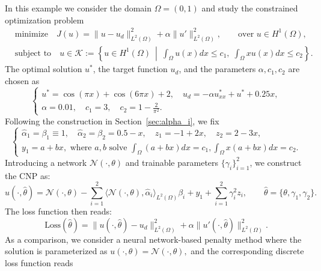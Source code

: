 \documentclass{article}
\numberwithin{equation}{section}
\begin{document}
In this example we consider the domain $\Omega=(0,1)$ and study the constrained optimization problem
\begin{align*}
    &\text{minimize}\quad J(u)=
    \|u-u_d\|_{L^2(\Omega)}^2 
    + \alpha\|u'\|_{L^2(\Omega)}^{2}, \qquad \text{over } u\in H^1(\Omega),\\
  &\text{subject to}\quad   u\in \mathcal{K}:=
    \left\{
    u\in H^1(\Omega)  
    \ \middle|\ 
    \int_\Omega u(x)dx\le c_1,\;
    \int_\Omega x u(x)dx\le c_2
    \right\}.
\end{align*}
The optimal solution $u^*$, the target function $u_d$, and the parameters $\alpha,c_1,c_2$ are chosen as
\begin{equation}
\begin{cases}
u^* = \cos(\pi x) + \cos(6\pi x) + 2,\quad
u_d = -\alpha u^*_{xx} + u^* + 0.25x, \\
\alpha=0.01, 
\quad 
c_1 = 3,
\quad 
c_2 = 1-\frac{2}{\pi^2}.
\end{cases} 
\end{equation}
Following the construction in Section~\ref{sec:alpha_i}, we fix
\begin{equation}
\begin{cases}
\hat{\alpha}_1=\beta_1\equiv 1, 
\quad 
\hat{\alpha}_2=\beta_2=0.5-x,\quad z_1 = -1+2x,
\quad 
z_2=2-3x,\\
y_1 = a +bx, \text{ where $a,b$ solve }
\int_\Omega (a+bx)dx=c_1,
\int_\Omega x(a+bx)dx=c_2.
\end{cases}
\end{equation}
Introducing a network $\mathcal{N}(\cdot,\theta)$ and trainable parameters $\{\gamma_i\}_{i=1}^2$, we construct the CNP as:
\begin{equation}
     u(\cdot,\hat{\theta})
     =
     \mathcal{N}(\cdot,\theta)
     -\sum_{i=1}^2 
     \langle \mathcal{N}(\cdot,\theta),\hat{\alpha}_i\rangle_{L^2(\Omega)}\beta_i
     + y_1
     + \sum_{i=1}^2 \gamma_i^2 z_i,
     \qquad 
     \hat{\theta} = \{\theta,\gamma_1,\gamma_2\}.
\end{equation}
The loss function then reads:
\begin{equation}
    \text{Loss}(\hat{\theta})
    =
    \|u(\cdot,\hat{\theta})-u_d\|_{L^2(\Omega)}^2
    +\alpha\|u'(\cdot,\hat{\theta})\|_{L^2(\Omega)}^{2}.
\end{equation}
As a comparison, we consider a neural network-based penalty method where the solution is parameterized as $u(\cdot,\theta)=\mathcal{N}(\cdot,\theta),$ and the corresponding discrete loss function reads
\end{document}
